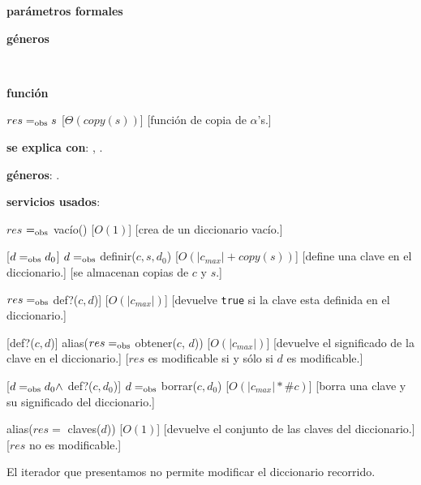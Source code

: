 \begin{Interfaz}

	\textbf{parámetros formales}\parindent\\
	\parbox{1.7cm}{\textbf{géneros}} \TipoVariable{$\alpha$}\\
	\parbox[t]{1.7cm}{\textbf{función}}\parbox[t]{\textwidth-2\parindent-1.7cm}{
		{$res =_{\mathrm{obs}} s$}
		[$\Theta(copy(s))$]
		[función de copia de $\alpha$'s.]
	}

	\textbf{se explica con}: , .

	\textbf{géneros}: \TipoVariable{\dicString, \itDicString}.

	\textbf{servicios usados}: 



	{$res$ $=_{\mathrm{obs}}$ vacío()}
	[$O(1)$]
	[crea de un diccionario vacío.]

	[$d =_{\mathrm{obs}} d_0$]
	{$d =_{\mathrm{obs}}$ definir($c, s, d_0$)}
	[$O(|c_{max}| + copy(s))$]
	[define una clave en el diccionario.]
	[se almacenan copias de $c$ y $s$.]

	{$res =_{\mathrm{obs}}$ def?($c, d$)]}
	[$O(|c_{max}|)$]
	[devuelve \texttt{true} si la clave esta definida en el diccionario.]

	[def?($c, d$)]
	{alias($res =_{\mathrm{obs}}$ obtener($c$, $d$))}
	[$O(|c_{max}|)$]
	[devuelve el significado de la clave en el diccionario.]
	[$res$ es modificable si y sólo si $d$ es modificable.]

	[$d =_{\mathrm{obs}} d_0 \land$ def?($c, d_0$)]
	{$d =_{\mathrm{obs}}$ borrar($c, d_0$)}
	[$O(|c_{max}| * \#c)$]
	[borra una clave y su significado del diccionario.]

	{alias($res =$ claves($d$))}
	[$O(1)$]
	[devuelve el conjunto de las claves del diccionario.]
	[$res$ no es modificable.]



	El iterador que presentamos no permite modificar el diccionario recorrido.


\end{Interfaz}
